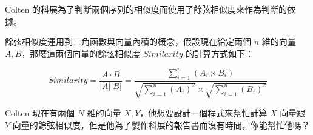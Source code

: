 Colten 的科展為了判斷兩個序列的相似度而使用了餘弦相似度來作為判斷的依據。

餘弦相似度運用到三角函數與向量內積的概念，假設現在給定兩個 $n$ 維的向量 $A,B$，那麼這兩個向量的餘弦相似度 $Similarity$ 的計算方式如下：

$$Similarity =  \frac{A \cdot B}{|A||B|} = \frac{\sum\limits_{i=1}^{n}{(A_i \times B_i)} }{\sqrt{\sum\limits_{i=1}^{n}{(A_i)^2}} \times \sqrt{\sum\limits_{i=1}^{n}{(B_i)^2}}  }$$

Colten 現在有兩個 $N$ 維的向量 $X,Y$，他想要設計一個程式來幫忙計算 $X$ 向量跟 $Y$ 向量的餘弦相似度，但是他為了製作科展的報告書而沒有時間，你能幫忙他嗎？

